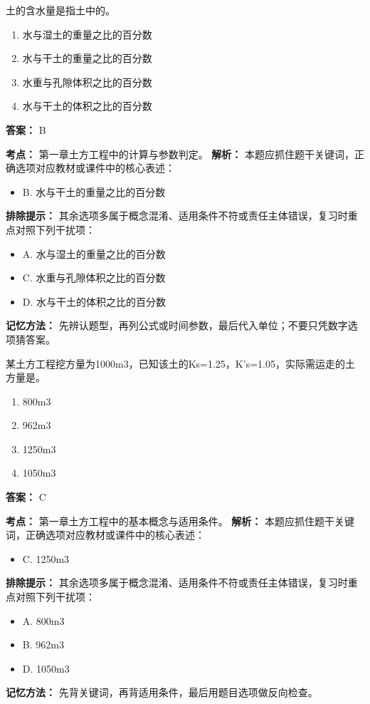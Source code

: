 \documentclass[UTF8,fontset=fandol,11pt]{ctexart}
\begin{document}
\begin{quizbox}[title={第 2 题}]
土的含水量是指土中的。\\
\begin{enumerate}[label=\Alph*.]
\item 水与湿土的重量之比的百分数
\item 水与干土的重量之比的百分数
\item 水重与孔隙体积之比的百分数
\item 水与干土的体积之比的百分数
\end{enumerate}
\textbf{答案：} B
\vspace{0.25em}
\begin{answerbox}[title={考点解析}]
\textbf{考点：} 第一章土方工程中的计算与参数判定。
\textbf{解析：} 本题应抓住题干关键词，正确选项对应教材或课件中的核心表述：
\begin{itemize}
\item B. 水与干土的重量之比的百分数
\end{itemize}
\textbf{排除提示：} 其余选项多属于概念混淆、适用条件不符或责任主体错误，复习时重点对照下列干扰项：
\begin{itemize}
\item A. 水与湿土的重量之比的百分数
\item C. 水重与孔隙体积之比的百分数
\item D. 水与干土的体积之比的百分数
\end{itemize}
\textbf{记忆方法：} 先辨认题型，再列公式或时间参数，最后代入单位；不要只凭数字选项猜答案。
\end{answerbox}
\end{quizbox}

\begin{quizbox}[title={第 3 题}]
某土方工程挖方量为1000m3，已知该土的Ks=1.25，K’s=1.05，实际需运走的土方量是。\\
\begin{enumerate}[label=\Alph*.]
\item 800m3
\item 962m3
\item 1250m3
\item 1050m3
\end{enumerate}
\textbf{答案：} C
\vspace{0.25em}
\begin{answerbox}[title={考点解析}]
\textbf{考点：} 第一章土方工程中的基本概念与适用条件。
\textbf{解析：} 本题应抓住题干关键词，正确选项对应教材或课件中的核心表述：
\begin{itemize}
\item C. 1250m3
\end{itemize}
\textbf{排除提示：} 其余选项多属于概念混淆、适用条件不符或责任主体错误，复习时重点对照下列干扰项：
\begin{itemize}
\item A. 800m3
\item B. 962m3
\item D. 1050m3
\end{itemize}
\textbf{记忆方法：} 先背关键词，再背适用条件，最后用题目选项做反向检查。
\end{answerbox}
\end{quizbox}
\end{document}
